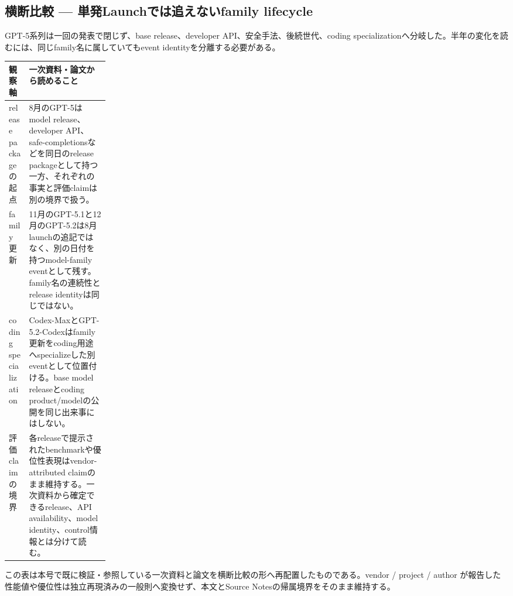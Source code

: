 \subsection*{横断比較 — 単発Launchでは追えないfamily lifecycle}
GPT-5系列は一回の発表で閉じず、base release、developer API、安全手法、後続世代、coding specializationへ分岐した。半年の変化を読むには、同じfamily名に属していてもevent identityを分離する必要がある。
\medskip
\begin{center}
\small
\renewcommand{\arraystretch}{1.16}
\begin{tabularx}{\linewidth}{@{}p{0.20\linewidth}X@{}}
\toprule
観察軸 & 一次資料・論文から読めること \\
\midrule
release packageの起点 & 8月のGPT-5はmodel release、developer API、safe-completionsなどを同日のrelease packageとして持つ一方、それぞれの事実と評価claimは別の境界で扱う。 \cite{src-aec54e92a7f3,src-05738f6c55b7,src-964121647555} \\
family更新 & 11月のGPT-5.1と12月のGPT-5.2は8月launchの追記ではなく、別の日付を持つmodel-family eventとして残す。family名の連続性とrelease identityは同じではない。 \cite{src-5bea303cfdb1,src-55da04f42e32} \\
coding specialization & Codex-MaxとGPT-5.2-Codexはfamily更新をcoding用途へspecializeした別eventとして位置付ける。base model releaseとcoding product/modelの公開を同じ出来事にはしない。 \cite{src-10ab1c39be14,src-cd8d6c8023f2} \\
評価claimの境界 & 各releaseで提示されたbenchmarkや優位性表現はvendor-attributed claimのまま維持する。一次資料から確定できるrelease、API availability、model identity、control情報とは分けて読む。 \cite{src-aec54e92a7f3,src-05738f6c55b7,src-964121647555,src-55da04f42e32} \\
\bottomrule
\end{tabularx}
\renewcommand{\arraystretch}{1.0}
\end{center}
\normalsize
\begin{claimboundary}[この比較の境界]
この表は本号で既に検証・参照している一次資料と論文を横断比較の形へ再配置したものである。vendor / project / author が報告した性能値や優位性は独立再現済みの一般則へ変換せず、本文とSource Notesの帰属境界をそのまま維持する。
\end{claimboundary}

